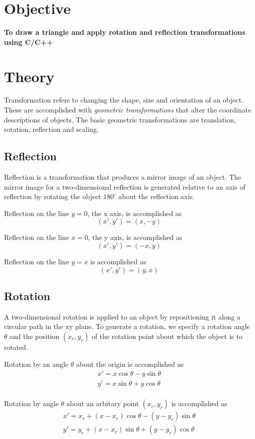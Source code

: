 \documentclass{article}
\begin{document}
\section*{Objective}
{\bfseries To draw a triangle and apply rotation and reflection transformations using C/C++}

\section*{Theory}
Transformation refers to changing the shape, size and orientation of an object. These are accomplished with \emph {geometric transformations} that alter the coordinate descriptions of objects. The basic geometric transformations are translation, rotation, reflection and scaling.
\subsection*{Reflection}
Reflection is a transformation that produces a mirror image of an object. The mirror image for a two-dimensional reflection is generated relative to an axis of reflection by rotating the object $180^{\circ}$ about the reflection axis.
\par Reflection on the line $y=0$, the x axis, is accomplished as
\begin{displaymath}
	(x',y') = (x, -y)
\end{displaymath}
\par Reflection on the line $x=0$, the y axis, is accomplished as
\begin{displaymath}
	(x',y') = (-x, y)
\end{displaymath}
\par Reflection on the line $y=x$ is accomplished as
\begin{displaymath}
	(x',y') = (y,x)
\end{displaymath}
\subsection*{Rotation}
A two-dimensional rotation is applied to an object by repositioning it along a circular path in the xy plane. To generate a rotation, we specify a rotation angle $\theta$ and the position $(x_r, y_r)$ of the rotation point about which the object is to rotated.
\par Rotation by an angle $\theta$ about the origin is accomplished as
\begin{eqnarray*}
	x' = x \cos \theta - y \sin \theta \\
	y' = x \sin \theta + y \cos \theta \\
\end{eqnarray*}
\par Rotation by angle $\theta$ about an arbitary point $(x_r, y_r)$ is accomplished as
\begin{eqnarray*}
	x' = x_r + (x - x_r)\cos \theta - (y-y_r) \sin \theta \\
	y' = y_r + (x - x_r)\sin \theta + (y - y_r) \cos \theta \\
\end{eqnarray*}
\end{document}
